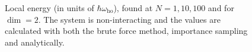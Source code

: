 \documentclass[
]{article}
\begin{document}
\begin{figure}[ht]
  \caption{Local energy (in units of $\hbar\omega_\text{ho}$), found at $N=1,10,100$  and for $\dim= 2$. The system is non-interacting and the values are calculated with both the brute force method, importance sampling and analytically.}
  \label{fig:BF_vs_IM_VS_analytical_2D}
\end{figure}
\end{document}
